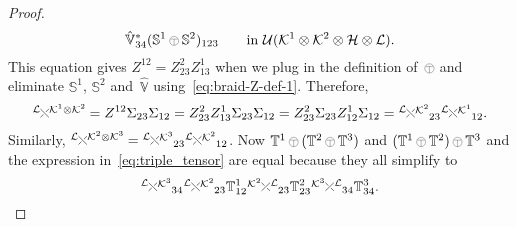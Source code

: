 \documentclass[a4paper]{amsart}
\numberwithin{equation}{section}
\theoremstyle{plain}
\numberwithin{theorem}{section}
\theoremstyle{definition}
\theoremstyle{remark}
\newcommand{\tenscorep}{\mathbin{\begin{tikzpicture}[baseline,x=.75ex,y=.75ex] \draw[line width=.2pt] (-0.8,1.15)--(0.8,1.15);\draw[line width=.2pt](0,-0.25)--(0,1.15); \draw[line width=.2pt] (0,0.75) circle [radius = 1];\end{tikzpicture}}}
\newcommand*{\Braiding}[2]{\begin{tikzpicture}[baseline]
    \draw[-] (0,0) -- (1.4ex,1.4ex) node[right,inner sep=0pt] {$\scriptstyle #2$};
    \draw[-,draw=white,line width=2.4pt] (0,1.4ex) -- (1.4ex,0);
    \draw[-] (1.4ex,0) -- (0,1.4ex) node[left,inner sep=0pt] {$\scriptstyle #1$};
  \end{tikzpicture}}
\newcommand*{\Dualbraiding}[2]{\begin{tikzpicture}[baseline]
    \draw[-] (1.4ex,0) -- (0,1.4ex) node[left,inner sep=0pt] {$\scriptstyle #1$};
    \draw[-,draw=white,line width=2.4pt] (0,0) -- (1.4ex,1.4ex);
    \draw[-] (0,0) -- (1.4ex,1.4ex) node[right,inner sep=0pt] {$\scriptstyle #2$};
  \end{tikzpicture}}
\newcommand*{\Corep}[1]{\mathbb{#1}}          %
\newcommand*{\DuCorep}[1]{\hat{\Corep{#1}}}   %
\newcommand*{\Flip}{\Sigma}%
\newcommand*{\Hils}[1][H]{\mathcal{#1}}%
\newcommand*{\U}{\mathcal U}%
\begin{document}
\begin{proof}
\begin{equation}
    \DuCorep{V}_{34}^* (\Corep{S}^1\tenscorep\Corep{S}^2)_{123}
    \qquad \text{in }\U(\Hils[K]^1\otimes\Hils[K]^2\otimes
    \Hils\otimes \Hils[L]).
  \end{equation}
  This equation gives \(Z^{12}=Z^2_{23}Z^1_{13}\) when we plug in
  the definition of~\(\tenscorep\) and eliminate \(\Corep{S}^1\),
  \(\Corep{S}^2\) and~\(\DuCorep{V}\) using~\eqref{eq:braid-Z-def-1}.
  Therefore,
  \[
  \Braiding{\Hils[L]}{\Hils[K]^1\otimes\Hils[K]^2}
  = Z^{12}\Flip_{23}\Flip_{12}
  = Z^2_{23}Z^1_{13}\Flip_{23}\Flip_{12}
  = Z^2_{23}\Flip_{23}Z^1_{12}\Flip_{12}
  = \Braiding{\Hils[L]}{\Hils[K]^2}_{23}\Braiding{\Hils[L]}{\Hils[K]^1}_{12}.
  \]
  Similarly, \(\Braiding{\Hils[L]}{\Hils[K]^2\otimes\Hils[K]^3} =
  \Braiding{\Hils[L]}{\Hils[K]^3}_{23}\Braiding{\Hils[L]}{\Hils[K]^2}_{12}\).
  Now \(\Corep{T}^1\tenscorep
  (\Corep{T}^2\tenscorep\Corep{T}^3)\) and \((\Corep{T}^1\tenscorep
  \Corep{T}^2)\tenscorep\Corep{T}^3\) and the expression
  in~\eqref{eq:triple_tensor} are equal because they all simplify to
  \[
  \Braiding{\Hils[L]}{\Hils[K]^3}_{34}\Braiding{\Hils[L]}{\Hils[K]^2}_{23}
  \Corep{T}^1_{12}\Dualbraiding{\Hils[K]^2}{\Hils[L]}_{23}\Corep{T}^2_{23}
  \Dualbraiding{\Hils[K]^3}{\Hils[L]}_{34}\Corep{T}^3_{34}.
  \]


\end{proof}
\end{document}
